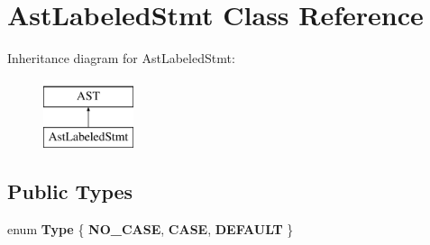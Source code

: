 \hypertarget{classAstLabeledStmt}{\section{Ast\-Labeled\-Stmt Class Reference}
\label{classAstLabeledStmt}
}
Inheritance diagram for Ast\-Labeled\-Stmt\-:\begin{figure}[H]
\begin{center}
\leavevmode
\includegraphics[height=2.000000cm]{classAstLabeledStmt}
\end{center}
\end{figure}
\subsection*{Public Types}
\begin{DoxyCompactItemize}
\item 
enum {\bfseries Type} \{ {\bfseries N\-O\-\_\-\-C\-A\-S\-E}, 
{\bfseries C\-A\-S\-E}, 
{\bfseries D\-E\-F\-A\-U\-L\-T}
 \}
\end{DoxyCompactItemize}
